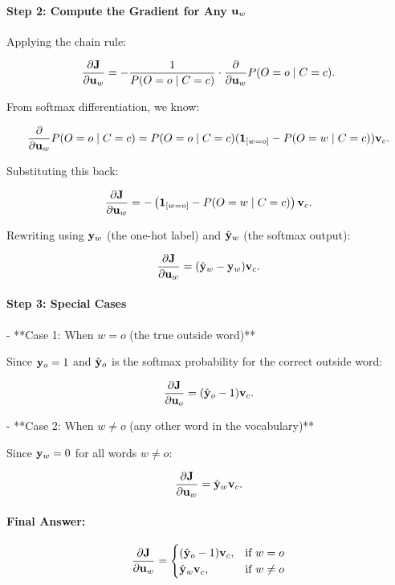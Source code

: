 \begin{parts}
{\paragraph{Step 2: Compute the Gradient for Any $\mathbf{u}_w$}
Applying the chain rule:

\[
\frac{\partial \mathbf{J}}{\partial \mathbf{u}_w} = - \frac{1}{P(O = o \mid C = c)} \cdot \frac{\partial}{\partial \mathbf{u}_w} P(O = o \mid C = c).
\]

From softmax differentiation, we know:

\[
\frac{\partial}{\partial \mathbf{u}_w} P(O = o \mid C = c) =
P(O = o \mid C = c) ( \mathbf{1}_{[w = o]} - P(O = w \mid C = c) ) \mathbf{v}_c.
\]

Substituting this back:

\[
\frac{\partial \mathbf{J}}{\partial \mathbf{u}_w} = - \left( \mathbf{1}_{[w = o]} - P(O = w \mid C = c) \right) \mathbf{v}_c.
\]

Rewriting using $\mathbf{y}_w$ (the one-hot label) and $\hat{\mathbf{y}}_w$ (the softmax output):

\[
\frac{\partial \mathbf{J}}{\partial \mathbf{u}_w} = (\hat{\mathbf{y}}_w - \mathbf{y}_w) \mathbf{v}_c.
\]

\paragraph{Step 3: Special Cases}

- **Case 1: When $w = o$ (the true outside word)**

  Since $\mathbf{y}_o = 1$ and $\hat{\mathbf{y}}_o$ is the softmax probability for the correct outside word:

  \[
  \frac{\partial \mathbf{J}}{\partial \mathbf{u}_o} = (\hat{\mathbf{y}}_o - 1) \mathbf{v}_c.
  \]

- **Case 2: When $w \neq o$ (any other word in the vocabulary)**

  Since $\mathbf{y}_w = 0$ for all words $w \neq o$:

  \[
  \frac{\partial \mathbf{J}}{\partial \mathbf{u}_w} = \hat{\mathbf{y}}_w \mathbf{v}_c.
  \]

\paragraph{Final Answer:}
\[
\frac{\partial \mathbf{J}}{\partial \mathbf{u}_w} =
\begin{cases}
(\hat{\mathbf{y}}_o - 1) \mathbf{v}_c, & \text{if } w = o \\
\hat{\mathbf{y}}_w \mathbf{v}_c, & \text{if } w \neq o
\end{cases}
\]

}

\end{parts}
